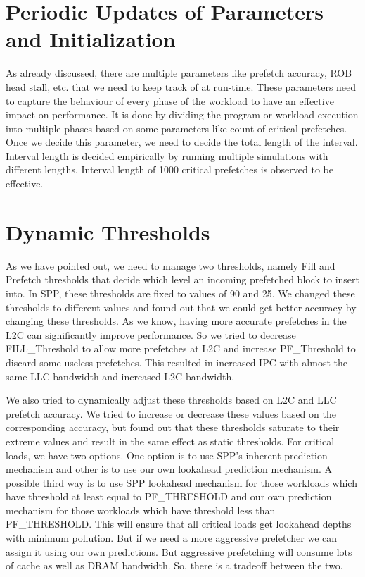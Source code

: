 \section{Periodic Updates of Parameters and Initialization}

As already discussed, there are multiple parameters like prefetch accuracy, ROB head stall, etc. that we need to keep track of at run-time. 
These parameters need to capture the behaviour of every phase of the workload to have an effective impact on
performance. It is done by dividing the program or workload execution into multiple phases
based on some parameters like count of critical prefetches.
Once we decide this parameter, we need to decide the total length of the interval. Interval
length is decided empirically by running multiple simulations with different lengths. Interval length of 1000 critical prefetches is observed to be effective.

\section{Dynamic Thresholds}

As we have pointed out, we need to manage two thresholds, namely Fill and Prefetch thresholds that decide which level an incoming
prefetched block to insert into. In SPP, these thresholds are fixed to values of 90 and 25. We changed these
thresholds to different values and found out that we could get better accuracy by changing these
thresholds.
As we know, having more accurate prefetches in the L2C can significantly improve
performance. So we tried to decrease FILL\_Threshold to allow more prefetches at L2C
and increase PF\_Threshold to discard some useless prefetches.
This resulted in increased IPC with almost the same LLC bandwidth and increased L2C bandwidth.

We also tried to dynamically adjust these thresholds based on L2C and LLC prefetch accuracy. We
tried to increase or decrease these values based on the corresponding accuracy, but found out that these
thresholds saturate to their extreme values and result in the same effect as static thresholds.
For critical loads, we have two options. One option is to use SPP's inherent prediction mechanism and other
is to use our own lookahead prediction mechanism. A possible third way is to use SPP lookahead mechanism
for those workloads which have threshold at least equal to PF\_THRESHOLD and our own prediction mechanism
for those workloads which have threshold less than PF\_THRESHOLD. This will ensure that all
critical loads get lookahead depths with minimum pollution.
But if we need a more aggressive prefetcher we can assign it using our own predictions. But
aggressive prefetching will consume lots of cache as well as DRAM bandwidth. So, there is a tradeoff
between the two.

